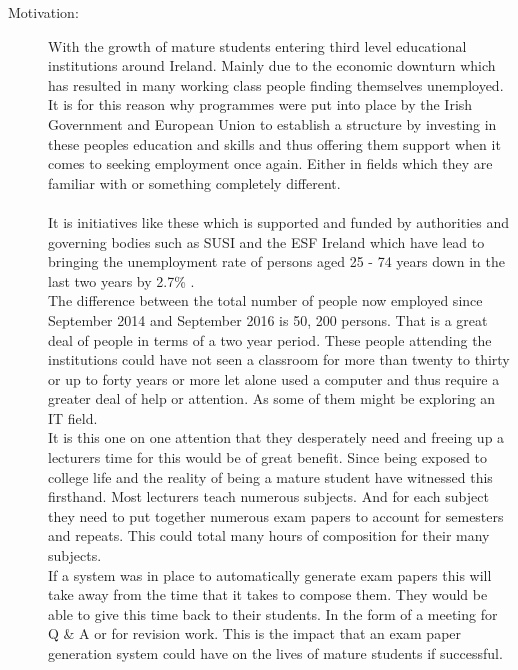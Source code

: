 \begin{description}
  \item[Motivation:]
  
  \begin{comment}
Why do we care about the problem and the results? If the problem isn't obviously
"interesting" it might be better to put motivation first; but if your work is incremental progress
on a problem that is widely recognised as important, then it is probably better to put the problem
statement first to indicate which piece of the larger problem you are breaking off to work on. This
section should include the importance of your work, the difficulty of the area, and the impact it
might have if successful.
\end{comment}

With the growth of mature students entering third level educational institutions around Ireland. Mainly due to the economic downturn which has resulted in many working class people finding themselves unemployed. \\It is for this reason why programmes were put into place by the Irish Government and European Union to establish a structure by investing in these peoples education and skills and thus offering them support when it comes to seeking employment once again. Either in fields which they are familiar with or something completely different. \\ \\It is initiatives like these which is supported and funded by authorities and governing bodies such as SUSI and the ESF Ireland which have lead to bringing the unemployment rate of persons aged 25 - 74 years down in the last two years by 2.7\% \cite{Cso2016} \cite{Esf2016}. \\The difference between the total number of people now employed since September 2014 and September 2016 is 50, 200 persons. That is a great deal of people in terms of a two year period. These people attending the institutions could have not seen a classroom for more than twenty to thirty or up to forty years or more let alone used a computer and thus require a greater deal of help or attention. As some of them might be exploring an IT field. \\It is this one on one attention that they desperately need and freeing up a lecturers time for this would be of great benefit. Since being exposed to college life and the reality of being a mature student have witnessed this firsthand. Most lecturers teach numerous subjects. And for each subject they need to put together numerous exam papers to account for semesters and repeats. This could total many hours of composition for their many subjects. \\If a system was in place to automatically generate exam papers this will take away from the time that it takes to compose them. They would be able to give this time back to their students. In the form of a meeting for Q \& A or for revision work. This is the impact that an exam paper generation system could have on the lives of mature students if successful.


\end{description}

